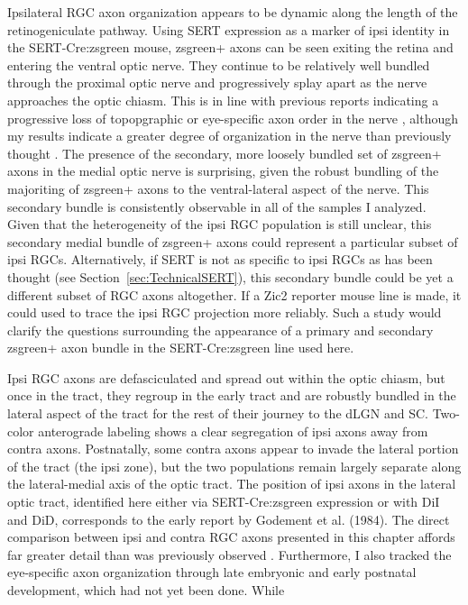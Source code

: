 Ipsilateral RGC axon organization appears to be dynamic along the length of the retinogeniculate pathway.
Using SERT expression as a marker of ipsi identity in the SERT-Cre:zsgreen mouse, zsgreen+ axons can be seen exiting the retina and entering the ventral optic nerve.
They continue to be relatively well bundled through the proximal optic nerve and progressively splay apart as the nerve approaches the optic chiasm.
This is in line with previous reports indicating a progressive loss of topopgraphic or eye-specific axon order in the nerve \cite{colello1990early,chan1994changes,chan1999changes}, although my results indicate a greater degree of organization in the nerve than previously thought \cite{baker1989distribution}.
The presence of the secondary, more loosely bundled set of zsgreen+ axons in the medial optic nerve is surprising, given the robust bundling of the majoriting of zsgreen+ axons to the ventral-lateral aspect of the nerve.
This secondary bundle is consistently observable in all of the samples I analyzed.
Given that the heterogeneity of the ipsi RGC population is still unclear, this secondary medial bundle of zsgreen+ axons could represent a particular subset of ipsi RGCs.
Alternatively, if SERT is not as specific to ipsi RGCs as has been thought (see Section~\ref{sec:TechnicalSERT}), this secondary bundle could be yet a different subset of RGC axons altogether.
If a Zic2 reporter mouse line is made, it could used to trace the ipsi RGC projection more reliably.
Such a study would clarify the questions surrounding the appearance of a primary and secondary zsgreen+ axon bundle in the SERT-Cre:zsgreen line used here.

Ipsi RGC axons are defasciculated and spread out within the optic chiasm, but once in the tract, they regroup in the early tract and are robustly bundled in the lateral aspect of the tract for the rest of their journey to the dLGN and SC.
Two-color anterograde labeling shows a clear segregation of ipsi axons away from contra axons.
Postnatally, some contra axons appear to invade the lateral portion of the tract (the ipsi zone), but the two populations remain largely separate along the lateral-medial axis of the optic tract.
The position of ipsi axons in the lateral optic tract, identified here either via SERT-Cre:zsgreen expression or with DiI and DiD, corresponds to the early report by Godement et al. (1984).
The direct comparison between ipsi and contra RGC axons presented in this chapter affords far greater detail than was previously observed \cite{godement1984prenatal}.
Furthermore, I also tracked the eye-specific axon organization through late embryonic and early postnatal development, which had not yet been done.
While 

